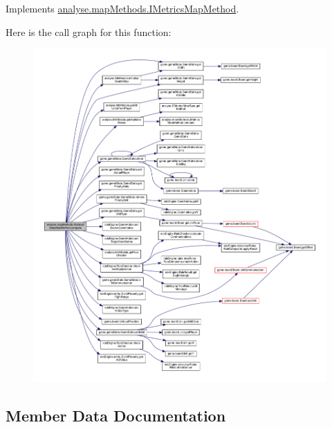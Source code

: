 Implements \mbox{\hyperlink{interfaceanalyse_1_1map_methods_1_1_i_metrics_map_method_aef15b826032a8cc1140563d539dd1319}{analyse.\+map\+Methods.\+I\+Metrics\+Map\+Method}}.

Here is the call graph for this function\+:
\nopagebreak
\begin{figure}[H]
\begin{center}
\leavevmode
\includegraphics[width=350pt]{classanalyse_1_1map_methods_1_1_abstract_deep_map_method_a02252e0eb987838131c5586ab775b849_cgraph}
\end{center}
\end{figure}


\subsection{Member Data Documentation}
\mbox{\label{classanalyse_1_1map_methods_1_1_abstract_deep_map_method_a90ee3a39a212a9cc99f22913cc8809a5}} 
